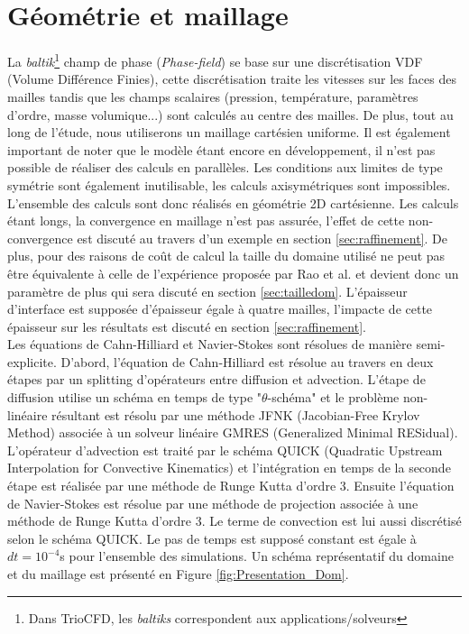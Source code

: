 \section{Géométrie et maillage}
La \textit{baltik}\footnote{Dans TrioCFD, les \textit{baltiks} correspondent aux applications/solveurs} champ de phase (\textit{Phase-field}) se base sur une discrétisation VDF (Volume Différence Finies), cette discrétisation traite les vitesses sur les faces des mailles tandis que les champs scalaires (pression, température, paramètres d'ordre, masse volumique...) sont calculés au centre des mailles. De plus, tout au long de l'étude, nous utiliserons un maillage cartésien uniforme.
Il est également important de noter que le modèle étant encore en développement, il n'est pas possible de réaliser des calculs en parallèles. Les conditions aux limites de type symétrie sont également inutilisable, les calculs axisymétriques sont impossibles. L'ensemble des calculs sont donc réalisés en géométrie 2D cartésienne. Les calculs étant longs, la convergence en maillage n'est pas assurée, l'effet de cette non-convergence est discuté au travers d'un exemple en section \ref{sec:raffinement}. De plus, pour des raisons de coût de calcul la taille du domaine utilisé ne peut pas être équivalente à celle de l'expérience proposée par Rao et al. et devient donc un paramètre de plus qui sera discuté en section \ref{sec:tailledom}. L'épaisseur d'interface est supposée d'épaisseur égale à quatre mailles, l'impacte de cette épaisseur sur les résultats est discuté en section \ref{sec:raffinement}. \\
Les équations de Cahn-Hilliard et Navier-Stokes sont résolues de manière semi-explicite. D'abord, l'équation de Cahn-Hilliard est résolue au travers en deux étapes par un splitting d'opérateurs entre diffusion et advection. L'étape de diffusion utilise un schéma en temps de type "$\theta$-schéma" et le problème non-linéaire résultant est résolu par une méthode JFNK (Jacobian-Free Krylov Method) associée à un solveur linéaire GMRES (Generalized Minimal RESidual). L'opérateur d'advection est traité par le schéma QUICK (Quadratic Upstream Interpolation for Convective Kinematics) et l'intégration en temps de la seconde étape est réalisée par une méthode de Runge Kutta d'ordre 3. Ensuite l'équation de Navier-Stokes est résolue par une méthode de projection associée à une méthode de Runge Kutta d'ordre 3. Le terme de convection est lui aussi discrétisé selon le schéma QUICK. Le pas de temps est supposé constant est égale à $dt = 10^{-4}$s pour l'ensemble des simulations. Un schéma représentatif du domaine et du maillage est présenté en Figure \ref{fig:Presentation_Dom}.

